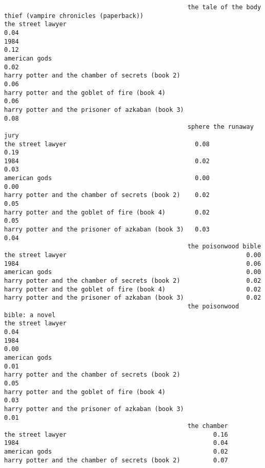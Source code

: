 \documentclass[
]{report}
\begin{document}
\begin{verbatim}
                                                  the tale of the body thief (vampire chronicles (paperback))
the street lawyer                                                                                        0.04
1984                                                                                                     0.12
american gods                                                                                            0.02
harry potter and the chamber of secrets (book 2)                                                         0.06
harry potter and the goblet of fire (book 4)                                                             0.06
harry potter and the prisoner of azkaban (book 3)                                                        0.08
                                                  sphere the runaway jury
the street lawyer                                   0.08             0.19
1984                                                0.02             0.03
american gods                                       0.00             0.00
harry potter and the chamber of secrets (book 2)    0.02             0.05
harry potter and the goblet of fire (book 4)        0.02             0.05
harry potter and the prisoner of azkaban (book 3)   0.03             0.04
                                                  the poisonwood bible
the street lawyer                                                 0.00
1984                                                              0.06
american gods                                                     0.00
harry potter and the chamber of secrets (book 2)                  0.02
harry potter and the goblet of fire (book 4)                      0.02
harry potter and the prisoner of azkaban (book 3)                 0.02
                                                  the poisonwood bible: a novel
the street lawyer                                                          0.04
1984                                                                       0.00
american gods                                                              0.01
harry potter and the chamber of secrets (book 2)                           0.05
harry potter and the goblet of fire (book 4)                               0.03
harry potter and the prisoner of azkaban (book 3)                          0.01
                                                  the chamber
the street lawyer                                        0.16
1984                                                     0.04
american gods                                            0.02
harry potter and the chamber of secrets (book 2)         0.07

\end{verbatim}
\end{document}
